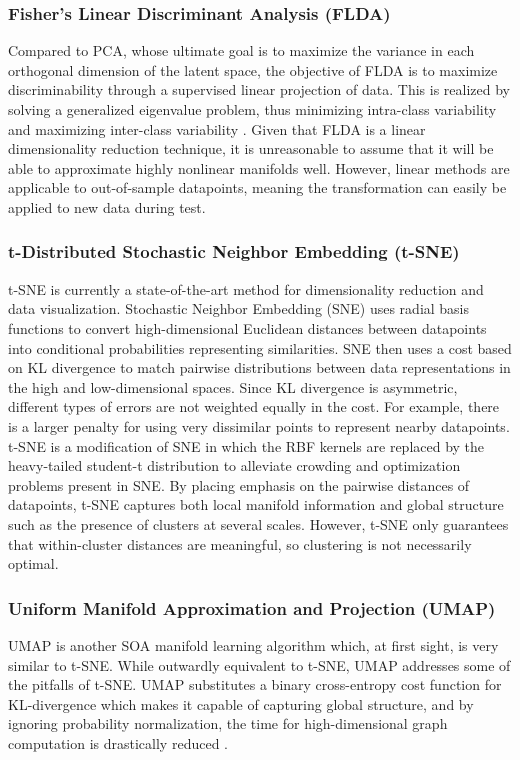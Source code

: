 \documentclass[conference]{IEEEtran}
\begin{document}
	\subsubsection*{Fisher's Linear Discriminant Analysis (FLDA)}  Compared to PCA, whose ultimate goal is to maximize the variance in each orthogonal dimension of the latent space, the objective of FLDA is to maximize discriminability through a supervised linear projection of data.  This is realized by solving a generalized eigenvalue problem, thus minimizing intra-class variability and maximizing inter-class variability \cite{Murphy2012Textbook,Sugiyama2006FDASupDimRed}.  Given that FLDA is a linear dimensionality reduction technique, it is unreasonable to assume that it will be able to approximate highly nonlinear manifolds well.   However, linear methods are applicable to out-of-sample datapoints, meaning the transformation can easily be applied to new data during test.
	
	\subsubsection*{t-Distributed Stochastic Neighbor Embedding (t-SNE)} t-SNE is currently a state-of-the-art method for dimensionality reduction and data visualization. Stochastic Neighbor Embedding (SNE) uses radial basis functions  to convert high-dimensional Euclidean distances between datapoints into conditional probabilities representing similarities.  SNE then uses a cost based on KL divergence to match pairwise distributions between data representations in the high and low-dimensional spaces.  Since KL divergence is asymmetric, different types of errors are not weighted equally in the cost.  For example, there is a larger penalty for using very dissimilar points to represent nearby datapoints.  t-SNE is a modification of SNE in which the RBF kernels are replaced by the heavy-tailed student-t distribution \cite{vanDerMaaten2008tSNE} to alleviate crowding and optimization problems present in SNE.  By placing emphasis on the pairwise distances of datapoints, t-SNE captures both local manifold information and global structure such as the presence of clusters at several scales. However, t-SNE only guarantees that within-cluster distances are meaningful, so clustering is not necessarily optimal.
	\subsubsection*{Uniform Manifold Approximation and Projection (UMAP)} UMAP is another SOA manifold learning algorithm which, at first sight, is very similar to t-SNE.  While outwardly equivalent to t-SNE, UMAP addresses some of the pitfalls of t-SNE.  UMAP substitutes a binary cross-entropy cost function for KL-divergence which makes it capable of capturing global structure, and by ignoring probability normalization, the time for high-dimensional graph computation is drastically reduced \cite{McInnes2018UMAP}.
\end{document}
